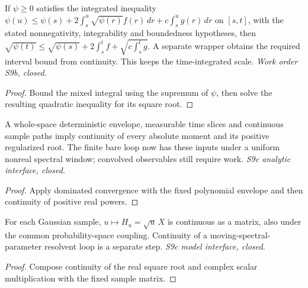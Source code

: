 \begin{lemma}\label{lem:moment-closing-base}
  \leanok
  If $\psi\ge0$ satisfies the integrated inequality
  $\psi(u)\le\psi(s)+2\int_s^u\sqrt{\psi(r)}f(r)\,dr
    +c\int_s^u g(r)\,dr$ on $[s,t]$, with the stated nonnegativity,
  integrability and boundedness hypotheses, then
  $\sqrt{\psi(t)}\le\sqrt{\psi(s)}+2\int_s^t f
    +\sqrt{c\int_s^t g}$.
  A separate wrapper obtains the required interval bound from continuity.
  This keeps the time-integrated scale. \emph{Work order S9b, closed.}
\end{lemma}
\begin{proof}\leanok
  Bound the mixed integral using the supremum of $\psi$, then solve the
  resulting quadratic inequality for its square root.
\end{proof}

\begin{lemma}\label{lem:moment-time-cont}
  \leanok
  A whole-space deterministic envelope, measurable time slices and continuous
  sample paths imply continuity of every absolute moment and its positive
  regularized root. The finite bare loop now has these inputs under a uniform
  nonreal spectral window; convolved observables still require work.
  \emph{S9c analytic interface, closed.}
\end{lemma}
\begin{proof}\leanok
  Apply dominated convergence with the fixed polynomial envelope and then
  continuity of positive real powers.
\end{proof}

\begin{lemma}
  \label{lem:flow-time-cont}
  \leanok
  For each Gaussian sample, $u\mapsto H_u=\sqrt u\,X$ is continuous as a
  matrix, also under the common probability-space coupling. Continuity of a
  moving-spectral-parameter resolvent loop is a separate step.
  \emph{S9c model interface, closed.}
\end{lemma}
\begin{proof}\leanok
  Compose continuity of the real square root and complex scalar multiplication
  with the fixed sample matrix.
\end{proof}

